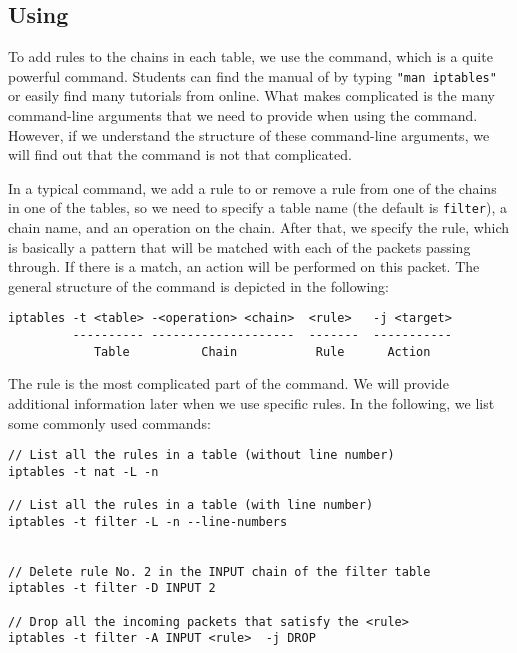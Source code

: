 \subsection{Using \iptables}


To add rules to the chains in each table, we use the \iptables command,
which is a quite powerful command. 
Students can find the manual of \iptables by typing \texttt{"man iptables"} 
or easily find many tutorials from online. 
What makes \iptables complicated is the many command-line arguments 
that we need to provide when
using the command. However, 
if we understand the structure of these command-line arguments, 
we will find out that the command is not that complicated. 


In a typical \iptables command, we add a rule to or remove a rule 
from one of the chains in one of the tables, so we need to 
specify a table name (the default is \texttt{filter}), a chain name, 
and an operation on the chain. After that, we specify the rule, which
is basically a pattern that will be matched with each of the 
packets passing through. If there is a match, an action will be 
performed on this packet. 
The general structure of the command is depicted in the following:

\begin{lstlisting}
iptables -t <table> -<operation> <chain>  <rule>   -j <target>
         ---------- --------------------  -------  -----------
            Table          Chain           Rule      Action
\end{lstlisting}


The rule is the most complicated part of the \iptables command. 
We will provide additional information later when we use 
specific rules. In the following, we list some commonly 
used commands: 


\begin{lstlisting}
// List all the rules in a table (without line number)
iptables -t nat -L -n

// List all the rules in a table (with line number)
iptables -t filter -L -n --line-numbers


// Delete rule No. 2 in the INPUT chain of the filter table 
iptables -t filter -D INPUT 2

// Drop all the incoming packets that satisfy the <rule>
iptables -t filter -A INPUT <rule>  -j DROP
\end{lstlisting}


